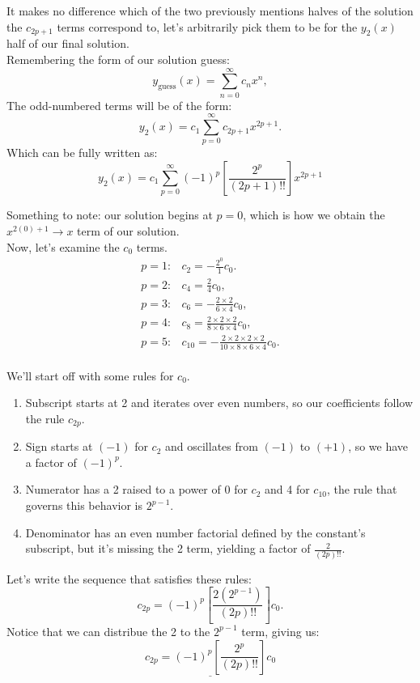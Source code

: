 \documentclass[a4paper,12pt]{article}
\begin{document}
 It makes no difference which of the two previously mentions halves of the solution the $c_{2p+1}$ terms correspond to, let's arbitrarily pick them to be for the $y_2(x)$ half of our final solution.\\

Remembering the form of our solution guess:
$$ y_{\text{guess}}(x) = \sum_{n=0}^{\infty} c_{n}x^n, $$
The odd-numbered terms will be of the form:
$$ y_2(x) = c_1 \sum_{p=0}^{\infty} c_{2p+1}x^{2p+1}. $$
Which can be fully written as:
$$ \boxed{y_2(x) = c_1\sum_{p=0}^{\infty} (-1)^p \left[\frac{2^p}{(2p+1)!!}\right]x^{2p+1}} $$

Something to note: our solution begins at $p=0$, which is how we obtain the $x^{2(0)+1} \rightarrow x$ term of our solution.\\

Now, let's examine the $c_0$ terms.
$$
\begin{array}{rl}
p=1: & c_2 = -\frac{2^0}{1} c_0. \\
p=2: & c_4 = \frac{2}{4}c_0, \\
p=3: & c_6 = -\frac{2\times2}{6\times4}c_0, \\
p=4: & c_8 = \frac{2\times2\times2}{8\times6\times4}c_0, \\
p=5: & c_{10} = -\frac{2\times2\times2\times2}{10\times8\times6\times4}c_0. \\
\end{array}
$$

We'll start off with some rules for $c_0$.
\begin{enumerate}
	\item Subscript starts at 2 and iterates over even numbers, so our coefficients follow the rule $c_{2p}$.
	\item Sign starts at $(-1)$ for $c_2$ and oscillates from $(-1)$ to $(+1)$, so we have a factor of $(-1)^p$.
	\item Numerator has a 2 raised to a power of 0 for $c_2$ and 4 for $c_{10}$, the rule that governs this behavior is $2^{p-1}$.
	\item Denominator has an even number factorial defined by the constant's subscript, but it's missing the 2 term, yielding a factor of $\frac{2}{(2p)!!}$.
\end{enumerate}
Let's write the sequence that satisfies these rules:
$$ c_{2p} = (-1)^{p}\left[\frac{2\left(2^{p-1}\right)}{(2p)!!}\right]c_0.$$
Notice that we can distribue the 2 to the $2^{p-1}$ term, giving us:
$$ \underline{c_{2p} = (-1)^{p}\left[\frac{2^{p}}{(2p)!!}\right]c_0} $$
\end{document}
